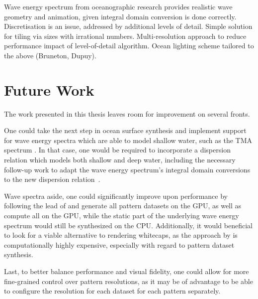
Wave energy spectrum from oceanographic research provides realistic wave geometry
and animation, given integral domain conversion is done correctly.
Discretisation is an issue, addressed by additional levels of detail.
Simple solution for tiling via sizes with irrational numbers.
Multi-resolution approach to reduce performance impact of level-of-detail
algorithm.
Ocean lighting scheme tailored to the above (Bruneton, Dupuy).

\section{Future Work}
The work presented in this thesis leaves room for improvement on several fronts.

One could take the next step in ocean surface synthesis and implement support
for wave energy spectra which are able to model shallow water, such as the
TMA spectrum \citep{Hughes:1984}. In that case, one would be required to
incorporate a dispersion relation which models both shallow and deep water,
including the necessary follow-up work to adapt the wave energy spectrum's
integral domain conversions to the new dispersion relation~\citep{Horvath:2015}.

Wave spectra aside, one could significantly improve upon performance by
following the lead of \cite{misc:oceanlightingfft} and generate all
pattern datasets on the GPU, as well as compute all \InvDiscreteFourierTransforms
on the GPU, while the static part of the underlying wave energy spectrum
would still be synthesized on the CPU. Additionally, it would beneficial
to look for a viable alternative to rendering whitecaps, as the approach
by \citet{article:whitecaps} is computationally highly expensive,
especially with regard to pattern dataset synthesis.


Last, to better balance performance and visual fidelity, one could allow
for more fine-grained control over pattern resolutions, as it may be
of advantage to be able to configure the resolution for each dataset for
each pattern separately.

